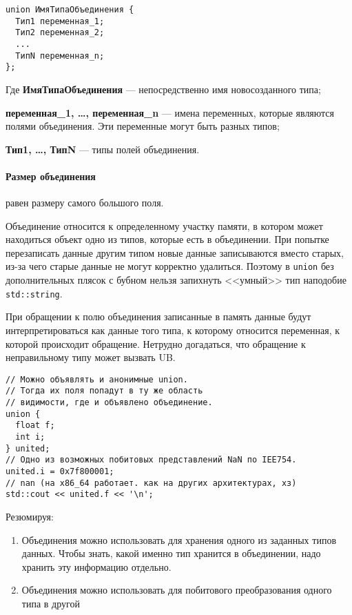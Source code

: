 \documentclass[14pt, a4paper]{extarticle}
\begin{document}
\begin{verbatim}
union ИмяТипаОбъединения {
  Тип1 переменная_1;
  Тип2 переменная_2;
  ...
  ТипN переменная_n;
};
\end{verbatim}

Где
\textbf{ИмяТипаОбъединения} --- непосредственно имя новосозданного типа;

\textbf{переменная\_1, \dots, переменная\_n} --- имена переменных, которые являются полями объединения.
Эти переменные могут быть разных типов;

\textbf{Тип1, \dots, ТипN} --- типы полей объединения.

\paragraph{Размер объединения} равен размеру самого большого поля.

Объединение относится к определенному участку памяти, в котором может находиться объект одно из типов,
которые есть в объединении. При попытке перезаписать данные другим типом новые данные записываются
вместо старых, из-за чего старые данные не могут корректно удалиться. Поэтому в \verb|union| без
дополнительных плясок с бубном нельзя запихнуть <<умный>> тип наподобие \verb|std::string|.

При обращении к полю объединения записанные в память данные будут
интерпретироваться как данные того типа, к которому относится переменная, к которой происходит
обращение. Нетрудно догадаться, что обращение к неправильному типу может вызвать UB.

\begin{verbatim}
// Можно объявлять и анонимные union.
// Тогда их поля попадут в ту же область
// видимости, где и объявлено объединение.
union {
  float f;
  int i;
} united;
// Одно из возможных побитовых представлений NaN по IEE754.
united.i = 0x7f800001;
// nan (на x86_64 работает. как на других архитектурах, хз)
std::cout << united.f << '\n';
\end{verbatim}

Резюмируя:
\begin{enumerate}
  \item Объединения можно использовать для хранения одного из заданных типов данных. Чтобы знать,
  какой именно тип хранится в объединении, надо хранить эту информацию отдельно.
  \item Объединения можно использовать для побитового преобразования одного типа в другой
\end{enumerate}
\end{document}
